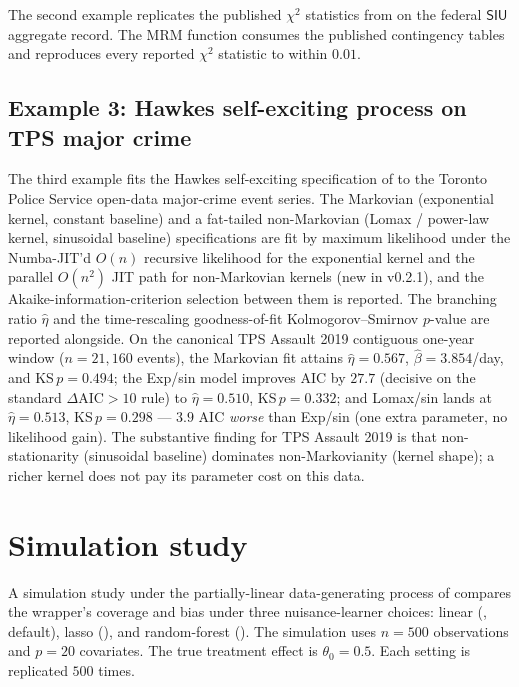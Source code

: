 \documentclass[article,shortnames,nojss]{jss}
\newcommand{\SIU}{\textsf{SIU}}
\begin{document}
The second example replicates the published $\chi^{2}$ statistics
from \citet{SprottDoob2023} on the federal $\SIU$ aggregate
record. The MRM  function consumes the
published contingency tables and reproduces every reported
$\chi^{2}$ statistic to within $0.01$.

\subsection{Example 3: Hawkes self-exciting process on TPS major
crime}

The third example fits the Hawkes self-exciting specification of
\citet{Ruhela2026Hawkes} to the Toronto Police Service open-data
major-crime event series.  The Markovian (exponential kernel,
constant baseline) and a fat-tailed non-Markovian (Lomax /
power-law kernel, sinusoidal baseline) specifications are fit
by maximum likelihood under the Numba-JIT'd $O(n)$ recursive
likelihood for the exponential kernel and the parallel $O(n^2)$
JIT path for non-Markovian kernels (new in  v0.2.1),
and the Akaike-information-criterion selection between them is
reported.  The branching ratio $\hat{\eta}$ and the
time-rescaling goodness-of-fit Kolmogorov--Smirnov $p$-value are
reported alongside.  On the canonical TPS Assault 2019
contiguous one-year window ($n=21{,}160$ events), the Markovian
fit attains $\hat\eta=0.567$, $\hat\beta=3.854$/day, and
KS\,$p=0.494$; the Exp/sin model improves AIC by $27.7$
(decisive on the standard $\Delta\mathrm{AIC} > 10$ rule) to
$\hat\eta=0.510$, KS\,$p=0.332$; and Lomax/sin lands at
$\hat\eta=0.513$, KS\,$p=0.298$ --- $3.9$ AIC \emph{worse} than
Exp/sin (one extra parameter, no likelihood gain).  The
substantive finding for TPS Assault 2019 is that
non-stationarity (sinusoidal baseline) dominates
non-Markovianity (kernel shape); a richer kernel does not pay
its parameter cost on this data.

\section{Simulation study}
\label{sec:simulation}

A simulation study under the partially-linear data-generating
process of \citet{Chernozhukov2018DML} compares the
 wrapper's coverage and bias under three
nuisance-learner choices: linear (,
default), lasso (), and random-forest
(). The simulation uses $n = 500$
observations and $p = 20$ covariates. The true treatment effect
is $\theta_0 = 0.5$. Each setting is replicated $500$ times.
\end{document}
